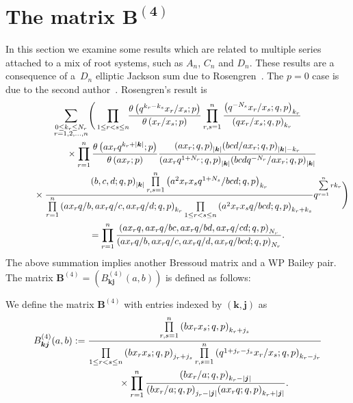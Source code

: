 \documentclass[pdftex]{sigma}
\numberwithin{equation}{section}
\newcommand\sumj{{\left| \boldsymbol {j} \right|}}
\newcommand\sumk{{\left| \boldsymbol{k} \right|}}
\newcommand{\B}{{ \mathbf B}}
\renewcommand{\k}{{ \boldsymbol{k}}}
\renewcommand{\j}{{ \boldsymbol{j}}}
\newcommand{\multsum}[3]{{\sum\limits_{\substack{{0\le #1_#3 \le #2_#3} \\
{#3 =1,2,\dots, n}}}}}
\newcommand{\triprod}[1]{\prod\limits_{1\le r < s \le #1}}
\newcommand{\sqprod}[1]{\prod\limits_{r, s =1}^{#1}} %
\newcommand{\smallprod}[1]{\prod\limits_{r =1}^{#1}} %
\newcommand{\xover}[1]{#1_{r}/#1_{s}}
\newcommand{\ellipticqrfac}[2]{{\left({#1}; q, p\right)_{#2}}} %
\newcommand{\elliptictheta}[1]{\theta \left({#1} ; p\right) }
\newcommand{\ellipticvandermonde}[3]{\triprod{#3} %
\!\! \frac{\elliptictheta{q^{#2_r-#2_s} \xover {#1} }}{\elliptictheta{\xover{#1}}}
}
\begin{document}
\section[The matrix $\B^{(4)}$]{The matrix $\boldsymbol{\B^{(4)}}$}\label{sec:matrix-B4}
In this section we examine some results which are related to multiple series attached to a mix of root systems, such as $A_n$, $C_n$ and $D_n$. These results are a consequence of a~$D_n$ elliptic Jackson sum due to Rosengren~\cite[Corollary~6.3]{HR2004}. The $p=0$ case is due to the second author~\cite{MS1997}. Rosengren's result is
\begin{gather}
\multsum{k}{N}{r} \Bigg( \ellipticvandermonde{x}{k}{n}
\sqprod n \frac{\ellipticqrfac{q^{-N_s}\xover{x}}{k_r} }{\ellipticqrfac{q\xover{x}}{k_r} }\notag\\
\qquad\quad{} \times \smallprod n \frac{\elliptictheta{ax_rq^{k_r+\sumk}}}{\elliptictheta{ax_r}}
\frac{\ellipticqrfac{ax_r}{\sumk}\ellipticqrfac{bcd/ax_r}{\sumk-k_r}}
{\ellipticqrfac{ax_rq^{1+N_r}}{\sumk}\ellipticqrfac{bcdq^{-N_r}/ax_r}{\sumk}}
\notag\\
\qquad\quad{} \times \frac{\ellipticqrfac{b,c,d}{\sumk}
\sqprod n \ellipticqrfac{a^2x_rx_sq^{1+N_s}/bcd}{k_r} }
{\smallprod n \ellipticqrfac{ax_rq/b, ax_rq/c, ax_rq/d}{k_r}
\triprod n \ellipticqrfac{a^2x_rx_sq/bcd}{k_r+k_s}}
q^{\sum\limits_{r=1}^n rk_r}\Bigg)\notag\\
\qquad{} = \smallprod n \frac{\ellipticqrfac{ax_rq, ax_rq/bc, ax_rq/bd, ax_rq/cd}{N_r}}
{\ellipticqrfac{ax_rq/b, ax_rq/c, ax_rq/d, ax_rq/bcd}{N_r}}.\label{e-8p7-3}
\end{gather}
The above summation implies another Bressoud matrix and a WP Bailey pair. The matrix $\B^{(4)}= (B^{(4)}_{\k\j}(a,b))$ is defined as follows:
\begin{Definition} We define the matrix $\B^{(4)}$ with entries indexed by $(\k , \j)$ as
\begin{gather}
B^{(4)}_{\k \j}(a,b) := \frac{\sqprod n \ellipticqrfac{bx_rx_s}{k_r+j_s} }
 {\triprod n \ellipticqrfac{bx_rx_s}{j_r+j_s} \sqprod n \ellipticqrfac{q^{1+j_r-j_s}\xover x }{k_r-j_r}} \nonumber\\
\hphantom{B^{(4)}_{\k \j}(a,b) :=}{} \times \smallprod n \frac{\ellipticqrfac{bx_r/a}{k_r-\sumj}}
{\ellipticqrfac{bx_r/a}{j_r-\sumj} \ellipticqrfac{ax_rq}{k_r+\sumj}} . \label{e-B4}
\end{gather}
\end{Definition}
\end{document}
